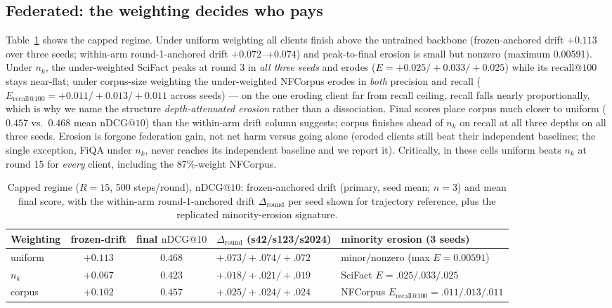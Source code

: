 \documentclass[sigconf,anonymous,review]{acmart}
\makeatletter
\newcommand{\ndcg}{\mathrm{nDCG@10}}
\newcommand{\rc}[1]{\mathrm{recall@#1}}
\newcommand{\RoundDrift}{\Delta_{\mathrm{round}}}
\makeatother
\begin{document}
\subsection{Federated: the weighting decides who pays}
Table~\ref{tab:capped} shows the capped regime. Under uniform weighting all clients finish above the untrained backbone (frozen-anchored drift $+0.113$ over three seeds; within-arm round-1-anchored drift $+0.072$--$+0.074$) and peak-to-final erosion is small but nonzero (maximum 0.00591). Under $n_k$, the under-weighted SciFact peaks at round 3 in \emph{all three seeds} and erodes ($E = +0.025/+0.033/+0.025$) while its $\rc{100}$ stays near-flat; under corpus-size weighting the under-weighted NFCorpus erodes in \emph{both} precision and recall ($E_{\rc{100}} = +0.011/+0.013/+0.011$ across seeds) --- on the one eroding client far from recall ceiling, recall falls nearly proportionally, which is why we name the structure \emph{depth-attenuated erosion} rather than a dissociation. Final scores place corpus much closer to uniform ($0.457$ vs.\ $0.468$ mean $\ndcg$) than the within-arm drift column suggests; corpus finishes ahead of $n_k$ on recall at all three depths on all three seeds. Erosion is forgone federation gain, not net harm versus going alone (eroded clients still beat their independent baselines; the single exception, FiQA under $n_k$, never reaches its independent baseline and we report it). Critically, in these cells uniform beats $n_k$ at round 15 for \emph{every} client, including the 87\%-weight NFCorpus.

\begin{table}[t]
\caption{Capped regime ($R{=}15$, 500 steps/round), $\ndcg$: frozen-anchored drift (primary, seed mean; $n{=}3$) and mean final score, with the within-arm round-1-anchored drift $\RoundDrift$ per seed shown for trajectory reference, plus the replicated minority-erosion signature.}
\label{tab:capped}
\begin{tabular}{lccl l}
\toprule
Weighting & frozen-drift & final $\ndcg$ & $\RoundDrift$ (s42/s123/s2024) & minority erosion (3 seeds)\\
\midrule
uniform & $+0.113$ & $0.468$ & $+.073/+.074/+.072$ & minor/nonzero (max $E{=}0.00591$)\\
$n_k$ & $+0.067$ & $0.423$ & $+.018/+.021/+.019$ & SciFact $E{=}.025/.033/.025$\\
corpus & $+0.102$ & $0.457$ & $+.025/+.024/+.024$ & NFCorpus $E_{\rc{100}}{=}.011/.013/.011$\\
\bottomrule
\end{tabular}
\end{table}
\end{document}
